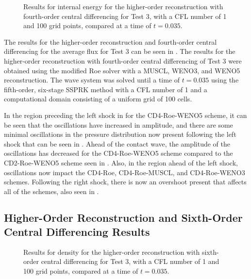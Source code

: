 \begin{figure}
	\caption[Results for internal energy for the higher-order reconstruction with fourth-order central differencing for Test 3, with a CFL number of 1 and 100 grid points, compared at a time of $t=0.035$.]{Results for internal energy for the higher-order reconstruction with fourth-order central differencing for Test 3, with a CFL number of 1 and 100 grid points, compared at a time of $t=0.035$.}
	\label{fig:Test4HORCD4energy}
\end{figure}
The results for the higher-order reconstruction and fourth-order central differencing for the average flux for Test 3 can be seen in . The results for the higher-order reconstruction with fourth-order central differencing of Test 3 were obtained using the modified Roe solver with a MUSCL, WENO3, and WENO5 reconstruction. The wave system was solved until a time of $t=0.035$ using the fifth-order, six-stage SSPRK method with a CFL number of 1 and a computational domain consisting of a uniform grid of 100 cells.

In the region preceding the left shock in  for the CD4-Roe-WENO5 scheme, it can be seen that the oscillations have increased in amplitude, and there are some minimal oscillations in the pressure distribution now present following the left shock that can be seen in .  Ahead of the contact wave, the amplitude of the oscillations has decreased for the CD4-Roe-WENO5 scheme compared to the CD2-Roe-WENO5 scheme seen in . Also, in the region ahead of the left shock, oscillations now impact the CD4-Roe, CD4-Roe-MUSCL, and CD4-Roe-WENO3 schemes. Following the right shock, there is now an overshoot present that affects all of the schemes, also seen in .

\subsection{Higher-Order Reconstruction and Sixth-Order Central Differencing Results}
\begin{figure}
	\caption[Results for density for the higher-order reconstruction with sixth-order central differencing for Test 3, with a CFL number of 1 and 100 grid points, compared at a time of $t=0.035$.]{Results for density for the higher-order reconstruction with sixth-order central differencing for Test 3, with a CFL number of 1 and 100 grid points, compared at a time of $t=0.035$.}
	\label{fig:Test4HORCD6density}
\end{figure}

